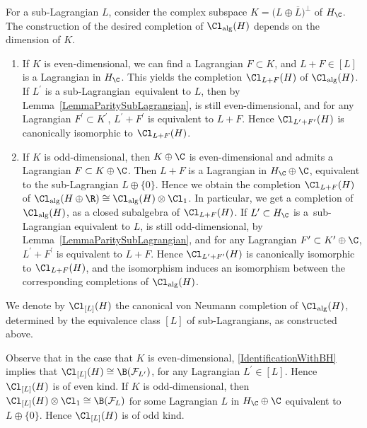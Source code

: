 For a sub-Lagrangian $L$, consider the complex subspace $K = \big(L \oplus \overline{L}\big)^\perp$ of $H_\C$.
The construction of the desired completion of $\Cl_{\mathrm{alg}}(H)$ depends on the dimension of $K$.
\begin{enumerate}\itemsep=0pt
\item[(i)] If $K$ is even-dimensional, we can find a Lagrangian $F \subset K$, and $L + F \in [L]$ is a Lagrangian in $H_\C$.
This yields the completion $\Cl_{L+F}(H)$ of $\Cl_{\mathrm{alg}}(H)$.
If $L^\prime$ is a sub-Lagrangian~equivalent to $L$, then by Lemma~\ref{LemmaParitySubLagrangian},  is still even-dimensional, and for any Lagrangian $F^\prime \subset K^\prime$, $L^\prime + F^\prime$ is equivalent to $L+F$.
Hence $\Cl_{L^\prime + F^\prime}(H)$ is canonically isomorphic to $\Cl_{L+F}(H)$.

\item[(ii)] If $K$ is odd-dimensional, then $K \oplus \C$ is even-dimensional and admits a Lagrangian $F \subset K \oplus \C$.
Then $L + F$ is a Lagrangian in $H_\C \oplus \C$, equivalent to the sub-Lagrangian $L \oplus \{0\}$.
Hence we obtain the completion $\Cl_{L+F}(H)$ of $\Cl_{\mathrm{alg}}(H \oplus \R) \cong \Cl_{\mathrm{alg}}(H) \otimes \Cl_1$.
In particular, we get a completion of $\Cl_{\mathrm{alg}}(H)$, as a closed subalgebra of $\Cl_{L+F}(H)$.
If $L^\prime \subset H_\C$ is a~sub-Lagrangian equivalent to $L$,  is still odd-dimensional, by Lemma~\ref{LemmaParitySubLagrangian}, and for any Lagrangian $F^\prime \subset K^\prime \oplus \C$, $L^\prime + F^\prime$ is equivalent to $L+F$.
Hence $\Cl_{L^\prime+F^\prime}(H)$ is canonically isomorphic to $\Cl_{L + F}(H)$, and the isomorphism induces an isomorphism between the corresponding completions of $\Cl_{\mathrm{alg}}(H)$.
\end{enumerate}

We denote by $\Cl_{[L]}(H)$ the canonical von Neumann completion of $\Cl_{\mathrm{alg}}(H)$, determined by the equivalence class $[L]$ of sub-Lagrangians, as constructed above.

Observe that in the case that $K$ is even-dimensional, \eqref{IdentificationWithBH} implies that $\Cl_{[L]}(H) \cong \B(\mathcal{F}_{L^\prime})$, for any Lagrangian $L^\prime \in [L]$.
Hence $\Cl_{[L]}(H)$ is of even kind.
If $K$ is odd-dimensional, then $\Cl_{[L]}(H) \otimes \Cl_1 \cong \B(\mathcal{F}_{L})$ for some Lagrangian $L$ in $H_\C \oplus \C$ equivalent to $L \oplus \{0\}$.
Hence $\Cl_{[L]}(H)$ is of odd kind.

